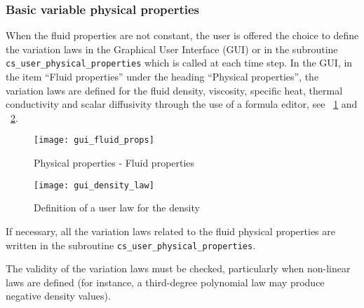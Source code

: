 {{{\subsubsection{Basic variable physical properties}\label{sec:usphyv}
When the fluid properties are not constant, the user is offered the choice to define the variation laws in the Graphical User Interface (GUI) or in the subroutine \texttt{cs\_user\_physical\_properties} which is called at each time step. In the GUI, in the item ``Fluid properties'' under the heading ``Physical properties'', the variation laws are defined for the fluid density, viscosity, specific heat, thermal conductivity and scalar diffusivity through the use of a formula editor, see \figurename~\ref{fig:gui_fluid_props2} and \figurename~\ref{fig:UL1_GUI}.
%
\begin{figure}[!ht]
\begin{center}
\texttt{[image: gui\_fluid\_props]}
\caption{Physical properties - Fluid properties}
\label{fig:gui_fluid_props2}
\end{center}
\end{figure}
%
\begin{figure}[!ht]
\begin{center}
\texttt{[image: gui\_density\_law]}
\caption{Definition of a user law for the density}
\label{fig:UL1_GUI}
\end{center}
\end{figure}

If necessary, all the variation laws related to the fluid physical properties are written in the subroutine \texttt{cs\_user\_physical\_properties}.

The validity of the variation laws must be checked, particularly when
non-linear laws are defined (for instance, a third-degree polynomial law
may produce negative density values).

}}}
